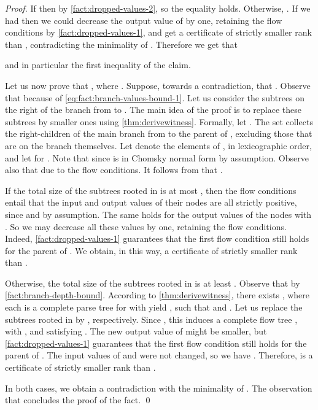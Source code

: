 \FactBranchValuesBoundOne*
\begin{proof}
If  then 
  by \cref{fact:dropped-values-2},
  so the equality  holds.
  Otherwise, .
  If we had  then we could
  decrease the output value of  by one,
  retaining the flow conditions by \cref{fact:dropped-values-1},
  and get a certificate
  of strictly smaller rank than ,
  contradicting the minimality of .
  Therefore we get that
  
  and in particular the first inequality of the claim.

  Let us now prove that ,
  where .
  Suppose, towards a contradiction, that .
  Observe that  because of
  \cref{eq:fact:branch-values-bound-1}.
  Let us consider the subtrees on the right of the branch from  to .
  The main idea of the proof is to replace these subtrees by smaller ones
  using \cref{thm:derivewitness}.
  Formally,
  let .
  The set  collects the right-children of the main branch from  to the parent of ,
  excluding those that are on the branch themselves.
  Let  denote the elements of ,
  in lexicographic order,
  and let  for .
  Note that  since  is in Chomsky normal form by assumption.
  Observe also that 
  due to the flow conditions.
  It follows from  that .

  If the total size of the subtrees rooted in  is
  at most ,
  then the flow conditions entail that
  the input and output values of their nodes are all strictly positive,
  since  and  by assumption.
  The same holds for the output values of the nodes  with
  .
  So we may decrease all these values by one,
  retaining the flow conditions.
  Indeed,
  \cref{fact:dropped-values-1} guarantees that the first flow condition
  still holds for the parent of .
  We obtain, in this way,
  a certificate of strictly smaller rank than .

  Otherwise,
  the total size of the subtrees rooted in  is
  at least .
  Observe that  by \cref{fact:branch-depth-bound}.
  According to \cref{thm:derivewitness},
  there exists ,
  where each  is a complete parse tree for  with
  yield ,
  such that 
  and .
  Let us replace the subtrees rooted in 
  by , respectively.
  Since ,
  this induces a complete flow tree
  ,
  with , and
  satisfying
  .
  The new output value of  might be smaller,
  but \cref{fact:dropped-values-1} guarantees that the first flow condition
  still holds for the parent of .
  The input values of  and  were not changed,
  so we have .
  Therefore,
   is a certificate
  of strictly smaller rank than .

  In both cases,
  we obtain a contradiction with the minimality of .
  The observation that 
  concludes the proof of the fact.
  \qed
\end{proof}

